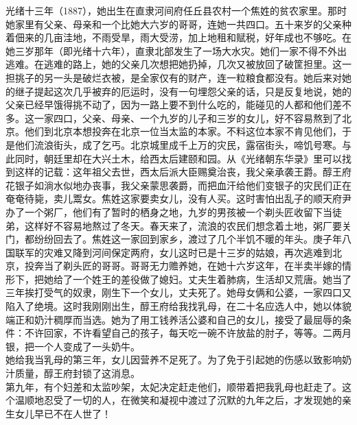 光绪十三年（1887），她出生在直隶河间府任丘县农村一个焦姓的贫农家里。那时她家里有父亲、母亲和一个比她大六岁的哥哥，连她一共四口。五十来岁的父亲种着佃来的几亩洼地，不雨受旱，雨大受涝，加上地租和赋税，好年成也不够吃。在她三岁那年（即光绪十六年），直隶北部发生了一场大水灾。她们一家不得不外出逃难。在逃难的路上，她的父亲几次想把她扔掉，几次又被放回了破筐担里。这一担挑子的另一头是破烂衣被，是全家仅有的财产，连一粒粮食都没有。她后来对她的继子提起这次几乎被弃的厄运时，没有一句埋怨父亲的话，只是反复地说，她的父亲已经早饿得挑不动了，因为一路上要不到什么吃的，能碰见的人都和他们差不多。这一家四口，父亲、母亲、一个九岁的儿子和三岁的女儿，好不容易熬到了北京。他们到北京本想投奔在北京一位当太监的本家。不料这位本家不肯见他们，于是他们流浪街头，成了乞丐。北京城里成千上万的灾民，露宿街头，啼饥号寒。与此同时，朝廷里却在大兴土木，给西太后建颐和园。从《光绪朝东华录》里可以找到这样的记载：这年祖父去世，西太后派大臣赐奠治丧，我父亲承袭王爵。醇王府花银子如淌水似地办丧事，我父亲蒙思袭爵，而把血汗给他们变银子的灾民们正在奄奄待毙，卖儿鬻女。焦姓这家要卖女儿，没有人买。这时害怕出乱子的顺天府尹办了一个粥厂，他们有了暂时的栖身之地，九岁的男孩被一个剃头匠收留下当徒弟，这样好不容易地熬过了冬天。春天来了，流浪的农民们想念着土地，粥厂要关门，都纷纷回去了。焦姓这一家回到家乡，渡过了几个半饥不暖的年头。庚子年八国联军的灾难又降到河间保定两府，女儿这时已是十三岁的姑娘，再次逃难到北京，投奔当了剃头匠的哥哥。哥哥无力赡养她，在她十六岁这年，在半卖半嫁的情形下，把她给了一个姓王的差役做了媳妇。丈夫生着肺病，生活却又荒唐。她当了三年挨打受气的奴隶，刚生下一个女儿，丈夫死了。她母女俩和公婆，一家四口又陷入了绝境。这时我刚刚出生，醇王府给我找乳母，在二十名应选人中，她以体貌端正和奶汁稠厚而当选。她为了用工钱养活公婆和自己的女儿，接受了最屈辱的条件：不许回家，不许看望自己的孩子，每天吃一碗不许放盐的肘子，等等。二两月银，把一个人变成了一头奶牛。\\

她给我当乳母的第三年，女儿因营养不足死了。为了免于引起她的伤感以致影响奶汁质量，醇王府封锁了这消息。\\

第九年，有个妇差和太监吵架，太妃决定赶走他们，顺带着把我乳母也赶走了。这个温顺地忍受了一切的人，在微笑和凝视中渡过了沉默的九年之后，才发现她的亲生女儿早已不在人世了！\\